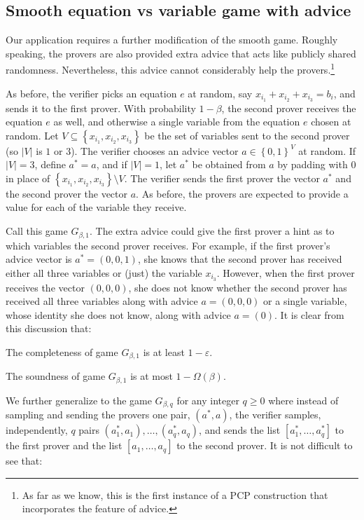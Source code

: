 \documentclass[11pt]{article}
\numberwithin{equation}{section}
\theoremstyle{definition}
\theoremstyle{plain}
\newcommand\set[1]{{\left\{ #1 \right\}}}
\newcommand\power[1]{\set{0,1}^{#1}}
\newcommand\eps{\varepsilon}
\renewcommand\geq{\geqslant}
\begin{document}
\subsection{Smooth equation vs variable game with advice}


Our application requires a further modification of the smooth game.
Roughly speaking,
the provers are also provided extra advice that acts like publicly shared randomness.
Nevertheless, this advice cannot considerably help the provers.\footnote{As far as we know, this is the first
instance of a PCP construction that incorporates the feature of advice.}

As before, the verifier picks an equation $e$ at random, say $x_{i_1} + x_{i_2} + x_{i_3} = b_{i}$,
and sends it to the first prover. With probability $1-\beta$, the second prover receives the
equation $e$ as well, and otherwise a single variable from the equation $e$ chosen at random.
Let $V\subseteq \set{x_{i_1},x_{i_2},x_{i_3}}$ be the set of variables sent to the second prover (so
$|V|$ is $1$ or $3$).
The verifier chooses an advice vector $a \in\power{V}$ at random. If $|V|=3$, define $a^* = a$, and
if $|V|=1$, let $a^*$ be obtained from $a$ by padding with $0$ in place of $\set{x_{i_1},x_{i_2},x_{i_3}}\setminus V$.
The verifier sends the first prover the vector $a^*$ and the second prover the vector $a$. As before, the
provers are expected to provide a value for each of the variable they receive.


Call this game $G_{\beta, 1}$. The extra advice could give the first prover a hint as to which variables the second prover receives.
For example, if the first prover's advice vector is $a^* = (0,0,1)$, she knows that the second prover has received
either all three variables or (just) the variable $x_{i_3}$.
However, when the first prover receives the vector $(0,0,0)$, she does not know whether the second prover has received
all three variables along with advice $a = (0,0,0)$ or a single variable, whose identity she does not know,
along with advice $a = (0)$. It is clear from this discussion that:

\smallskip
{} The completeness of game $G_{\beta, 1}$ is at least $1-\eps$.

\smallskip
{} The soundness of game $G_{\beta, 1}$ is at most $1- \Omega\left(\beta\right)$.

\smallskip
We further generalize to the game $G_{\beta, q}$ for any integer $q \geq 0$
where instead of sampling and sending the provers one pair,
%
%
$(a^*, a)$,
%
%
the verifier samples, %
independently, $q$ pairs $(a_1^*, a_1), \ldots, (a_q^*, a_q)$, and sends the list $[a_1^*, \ldots, a_q^* ]$ to the first prover and
the list $[a_1, \ldots, a_q]$ to the second prover. It is not difficult to see that:
\end{document}
